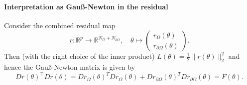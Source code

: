 \paragraph{Interpretation as Gau\ss-Newton in the residual}
Consider the combined residual map
\begin{equation*}
    r\colon\mathbb R^p\to\mathbb R^{N_\Omega+N_{\partial\Omega}}, \quad \theta \mapsto \begin{pmatrix}
        r_\Omega(\theta) \\ r_{\partial\Omega}(\theta)
    \end{pmatrix}.
\end{equation*}
Then (with the right choice of the inner product) $L(\theta) = \frac12 \lVert r(\theta) \rVert_2^2$ and hence the Gau\ss-Newton matrix is given by
\[ Dr(\theta)^\top Dr(\theta) = Dr_\Omega(\theta)^T Dr_\Omega(\theta) + Dr_{\partial\Omega}(\theta)^T Dr_{\partial\Omega}(\theta) = F(\theta). \]

